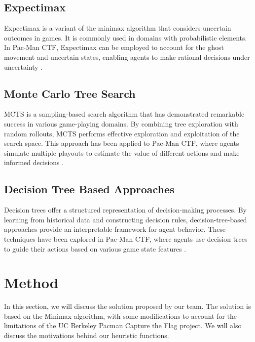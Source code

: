 \documentclass[a4paper,12pt]{article}
\begin{document}
\subsection{Expectimax}
\label{subsec:expectimax}
Expectimax is a variant of the minimax algorithm that considers uncertain outcomes in games. It is commonly used in domains with probabilistic elements. In Pac-Man CTF, Expectimax can be employed to account for the ghost movement and uncertain states, enabling agents to make rational decisions under uncertainty \cite{RIVEST198777}.

\subsection{Monte Carlo Tree Search}
\label{subsec:mcts}
MCTS is a sampling-based search algorithm that has demonstrated remarkable success in various game-playing domains. By combining tree exploration with random rollouts, MCTS performs effective exploration and exploitation of the search space. This approach has been applied to Pac-Man CTF, where agents simulate multiple playouts to estimate the value of different actions and make informed decisions \cite{GELLY20111856}.


\subsection{Decision Tree Based Approaches}
\label{subsec:decision_tree}
Decision trees offer a structured representation of decision-making processes. By learning from historical data and constructing decision rules, decision-tree-based approaches provide an interpretable framework for agent behavior. These techniques have been explored in Pac-Man CTF, where agents use decision trees to guide their actions based on various game state features \cite{Hastie2009}.


\section{Method}
\label{method}

In this section, we will discuss the solution proposed by our team. The solution is based on the Minimax algorithm, with some modifications to account for the limitations of the UC Berkeley Pacman Capture the Flag project. We will also discuss the motivations behind our heuristic functions.
\end{document}
